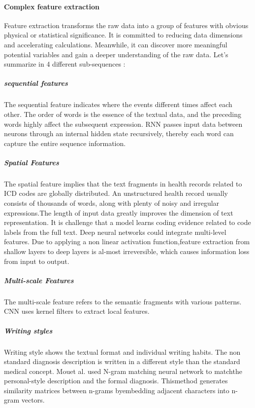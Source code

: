 \paragraph{Complex feature extraction}
Feature extraction transforms the raw data into a group of features with obvious physical or statistical significance. It is committed to reducing data dimensions and accelerating calculations.  Meanwhile,  it  can  discover  more  meaningful potential  variables  and  gain  a  deeper  understanding of the raw data.
Let's summarize in 4 different sub-sequences : 
\subparagraph{sequential features}
The sequential feature indicates where the events different  times  affect  each  other.  The  order  of  words  is  the essence of the textual data, and the preceding words highly affect  the  subsequent  expression.
RNN passes input data between neurons through  an  internal  hidden  state  recursively,  thereby  each word can capture the entire sequence information.
\subparagraph{Spatial Features}
The spatial feature implies that the text fragments in health records  related  to  ICD  codes  are  globally  distributed.  An unstructured health record usually consists of thousands of words, along with plenty of noisy and irregular expressions.The  length  of  input  data  greatly  improves  the  dimension of  text  representation.  It  is  challenge  that  a  model  learns coding evidence related to code labels from the full text. 
Deep  neural  networks  could  integrate  multi-level  features.  Due  to  applying  a  non linear  activation  function,feature extraction from shallow layers to deep layers is al-most irreversible, which causes information loss from input to  output. 
\subparagraph{Multi-scale Features}
The multi-scale feature refers to the semantic fragments with various  patterns.  CNN  uses  kernel  filters  to  extract  local features. 
\subparagraph{Writing styles}
Writing style shows the textual format and individual writing habits. The non standard diagnosis description is written in a different style than the standard medical concept. 
 Mouet al. used N-gram matching neural network to matchthe personal-style description and the formal diagnosis. Thismethod  generates  similarity  matrices  between  n-grams  byembedding  adjacent  characters  into  n-gram  vectors. 

